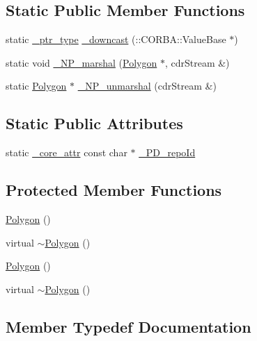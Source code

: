 \subsection*{Static Public Member Functions}
\begin{DoxyCompactItemize}
\item 
static \hyperlink{class_draw_a5164256572b3c4123ceecd1897c248dd}{\+\_\+ptr\+\_\+type} \hyperlink{class_polygon_ac866909cd0f37369c8b9a9367faeb72d}{\+\_\+downcast} (\+::C\+O\+R\+B\+A\+::\+Value\+Base $\ast$)
\item 
static void \hyperlink{class_polygon_a8ccbe5c3f82a1095d4c7a772ff5b8918}{\+\_\+\+N\+P\+\_\+marshal} (\hyperlink{class_polygon}{Polygon} $\ast$, cdr\+Stream \&)
\item 
static \hyperlink{class_polygon}{Polygon} $\ast$ \hyperlink{class_polygon_a1a84fd2c1473ceb918f5cfa2bebdbcc5}{\+\_\+\+N\+P\+\_\+unmarshal} (cdr\+Stream \&)
\end{DoxyCompactItemize}
\subsection*{Static Public Attributes}
\begin{DoxyCompactItemize}
\item 
static \hyperlink{_petit_prince_8hpp_a5f7bf7cddb608c2aad7c95f55f8a33c5}{\+\_\+core\+\_\+attr} const char $\ast$ \hyperlink{class_polygon_a3a8f0f25cfccaaf86f64f226442a6a08}{\+\_\+\+P\+D\+\_\+repo\+Id}
\end{DoxyCompactItemize}
\subsection*{Protected Member Functions}
\begin{DoxyCompactItemize}
\item 
\hyperlink{class_polygon_ac183e712f8be1e13f1c9d5b4d4512ead}{Polygon} ()
\item 
virtual \hyperlink{class_polygon_a873f9acee059f717277b6414102dab16}{$\sim$\+Polygon} ()
\item 
\hyperlink{class_polygon_ac183e712f8be1e13f1c9d5b4d4512ead}{Polygon} ()
\item 
virtual \hyperlink{class_polygon_a873f9acee059f717277b6414102dab16}{$\sim$\+Polygon} ()
\end{DoxyCompactItemize}


\subsection{Member Typedef Documentation}
